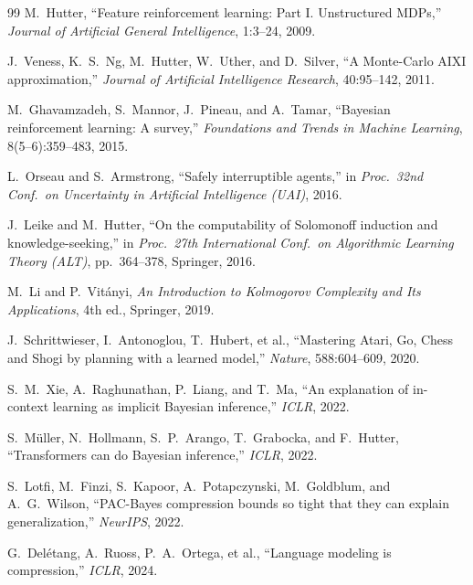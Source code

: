 \documentclass[11pt,a4paper]{article}
\theoremstyle{definition}
\theoremstyle{remark}
\begin{document}
\begin{thebibliography}{99}
M.~Hutter,
``Feature reinforcement learning: Part I. Unstructured MDPs,''
\emph{Journal of Artificial General Intelligence}, 1:3--24, 2009.

J.~Veness, K.~S.~Ng, M.~Hutter, W.~Uther, and D.~Silver,
``A Monte-Carlo AIXI approximation,''
\emph{Journal of Artificial Intelligence Research}, 40:95--142, 2011.

M.~Ghavamzadeh, S.~Mannor, J.~Pineau, and A.~Tamar,
``Bayesian reinforcement learning: A survey,''
\emph{Foundations and Trends in Machine Learning}, 8(5--6):359--483, 2015.

L.~Orseau and S.~Armstrong,
``Safely interruptible agents,''
in \emph{Proc.\ 32nd Conf.\ on Uncertainty in Artificial Intelligence (UAI)},
2016.

J.~Leike and M.~Hutter,
``On the computability of Solomonoff induction and knowledge-seeking,''
in \emph{Proc.\ 27th International Conf.\ on Algorithmic Learning Theory (ALT)},
pp.~364--378, Springer, 2016.

M.~Li and P.~Vit\'anyi,
\emph{An Introduction to Kolmogorov Complexity and Its Applications},
4th ed., Springer, 2019.

J.~Schrittwieser, I.~Antonoglou, T.~Hubert, et al.,
``Mastering Atari, Go, Chess and Shogi by planning with a learned model,''
\emph{Nature}, 588:604--609, 2020.

S.~M.\ Xie, A.~Raghunathan, P.~Liang, and T.~Ma,
``An explanation of in-context learning as implicit Bayesian inference,''
\emph{ICLR}, 2022.

S.~M\"uller, N.~Hollmann, S.~P.\ Arango, T.~Grabocka, and F.~Hutter,
``Transformers can do Bayesian inference,''
\emph{ICLR}, 2022.

S.~Lotfi, M.~Finzi, S.~Kapoor, A.~Potapczynski, M.~Goldblum, and A.~G.\ Wilson,
``PAC-Bayes compression bounds so tight that they can explain generalization,''
\emph{NeurIPS}, 2022.

G.~Del\'etang, A.~Ruoss, P.~A.\ Ortega, et al.,
``Language modeling is compression,''
\emph{ICLR}, 2024.

\end{thebibliography}
\endgroup
\end{document}
